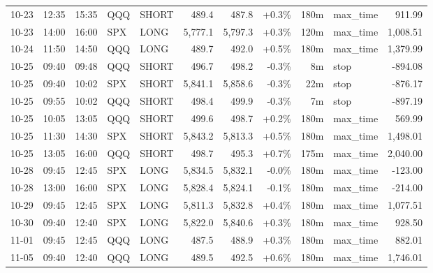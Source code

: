 \documentclass[11pt,a4paper,twoside]{article}
\begin{document}
\begin{center}
\begin{longtable}{>{\color{txtmain}}l l l l l r r r r >{\color{txtmain}}l r}
10-23 & 12:35 & 15:35 & QQQ & SHORT & 489.4 & 487.8 & \textcolor{wingreen}{+0.3\%} & 180m & max\_time & \textcolor{wingreen}{911.99} \\
10-23 & 14:00 & 16:00 & SPX & LONG & 5,777.1 & 5,797.3 & \textcolor{wingreen}{+0.3\%} & 120m & max\_time & \textcolor{wingreen}{1,008.51} \\
10-24 & 11:50 & 14:50 & QQQ & LONG & 489.7 & 492.0 & \textcolor{wingreen}{+0.5\%} & 180m & max\_time & \textcolor{wingreen}{1,379.99} \\
10-25 & 09:40 & 09:48 & QQQ & SHORT & 496.7 & 498.2 & \textcolor{lossred}{-0.3\%} & 8m & stop & \textcolor{lossred}{-894.08} \\
10-25 & 09:40 & 10:02 & SPX & SHORT & 5,841.1 & 5,858.6 & \textcolor{lossred}{-0.3\%} & 22m & stop & \textcolor{lossred}{-876.17} \\
10-25 & 09:55 & 10:02 & QQQ & SHORT & 498.4 & 499.9 & \textcolor{lossred}{-0.3\%} & 7m & stop & \textcolor{lossred}{-897.19} \\
10-25 & 10:05 & 13:05 & QQQ & SHORT & 499.6 & 498.7 & \textcolor{wingreen}{+0.2\%} & 180m & max\_time & \textcolor{wingreen}{569.99} \\
10-25 & 11:30 & 14:30 & SPX & SHORT & 5,843.2 & 5,813.3 & \textcolor{wingreen}{+0.5\%} & 180m & max\_time & \textcolor{wingreen}{1,498.01} \\
10-25 & 13:05 & 16:00 & QQQ & SHORT & 498.7 & 495.3 & \textcolor{wingreen}{+0.7\%} & 175m & max\_time & \textcolor{wingreen}{2,040.00} \\
10-28 & 09:45 & 12:45 & SPX & LONG & 5,834.5 & 5,832.1 & \textcolor{lossred}{-0.0\%} & 180m & max\_time & \textcolor{lossred}{-123.00} \\
10-28 & 13:00 & 16:00 & SPX & LONG & 5,828.4 & 5,824.1 & \textcolor{lossred}{-0.1\%} & 180m & max\_time & \textcolor{lossred}{-214.00} \\
10-29 & 09:45 & 12:45 & SPX & LONG & 5,811.3 & 5,832.8 & \textcolor{wingreen}{+0.4\%} & 180m & max\_time & \textcolor{wingreen}{1,077.51} \\
10-30 & 09:40 & 12:40 & SPX & LONG & 5,822.0 & 5,840.6 & \textcolor{wingreen}{+0.3\%} & 180m & max\_time & \textcolor{wingreen}{928.50} \\
11-01 & 09:45 & 12:45 & QQQ & LONG & 487.5 & 488.9 & \textcolor{wingreen}{+0.3\%} & 180m & max\_time & \textcolor{wingreen}{882.01} \\
11-05 & 09:40 & 12:40 & QQQ & LONG & 489.5 & 492.5 & \textcolor{wingreen}{+0.6\%} & 180m & max\_time & \textcolor{wingreen}{1,746.01} \\

\end{longtable}
\end{center}
\end{document}
